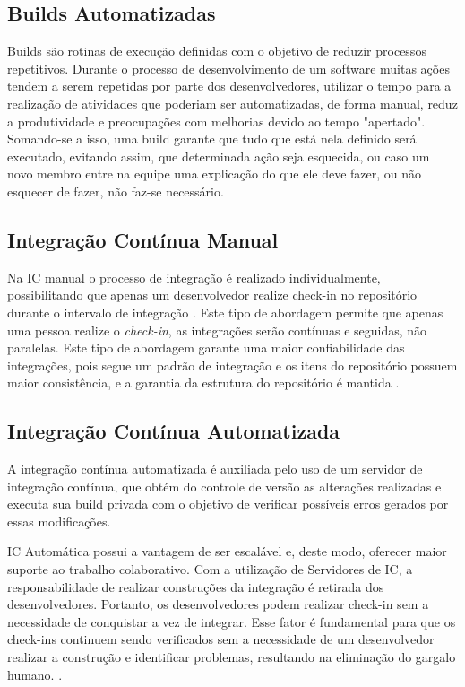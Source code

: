 \subsection{Builds Automatizadas}
Builds são rotinas de execução definidas com o objetivo de reduzir processos repetitivos. Durante o processo de desenvolvimento de um software muitas ações tendem a serem repetidas por parte dos desenvolvedores, utilizar o tempo para a realização  de atividades que poderiam ser automatizadas, de forma manual, reduz a produtividade e preocupações com melhorias devido ao tempo "apertado". Somando-se a isso, uma build garante que tudo que está nela definido será executado, evitando assim, que determinada ação seja esquecida, ou caso um novo membro entre na equipe uma explicação do que ele deve fazer, ou não esquecer de fazer, não faz-se necessário.

\subsection{Integração Contínua Manual}
Na IC manual o processo de integração é realizado individualmente, possibilitando que 
apenas um desenvolvedor realize check-in no repositório durante o intervalo de integração . Este tipo de abordagem permite que apenas uma pessoa realize o \textit{check-in}, as integrações serão contínuas e seguidas, não paralelas. Este tipo de abordagem garante uma maior confiabilidade das integrações, pois segue um padrão de integração e os itens do repositório possuem maior consistência, e a garantia da estrutura do repositório é mantida \cite{gleiph2011}.

\subsection{Integração Contínua Automatizada}
A integração contínua automatizada é auxiliada pelo uso de um servidor de integração contínua, que obtém do controle de versão as alterações realizadas e executa sua build privada com o objetivo de verificar possíveis erros gerados por essas modificações.
\begin{citacao}
IC Automática possui a vantagem de ser escalável 
e,  deste  modo,  oferecer  maior  suporte  ao  trabalho  colaborativo.  Com  a  utilização  de 
Servidores  de  IC,  a  responsabilidade  de  realizar  construções  da  integração  é  retirada  dos desenvolvedores. Portanto, os desenvolvedores podem realizar  check-in  sem a necessidade de 
conquistar a vez de integrar. Esse fator é fundamental para que os  check-ins  continuem sendo 
verificados  sem  a  necessidade  de  um desenvolvedor  realizar  a  construção  e identificar 
problemas, resultando na eliminação do gargalo humano. . 
\end{citacao}

